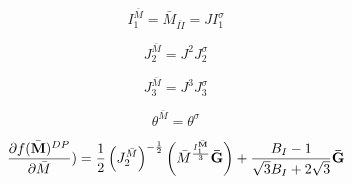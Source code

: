 \begin{equation}
    I_{1}^{\bar{M}} = \bar{M}_{\bar{II}} = J I_{1}^{\sigma}
\end{equation}


\begin{equation}
    J_{2}^{\bar{M}} = J^2 J_{2}^{\sigma}
\end{equation}


\begin{equation}
    J_{3}^{\bar{M}} = J^3 J_{3}^{\sigma}
\end{equation}


\begin{equation}
    \theta^{\bar{M}} = \theta^{\sigma}
\end{equation}


\begin{equation}
    \frac{ \partial f ( \bar{\bf M} )^{DP} }{ \partial \bar{M}} )\\
    = \frac{ 1 }{2} \left( J_{2}^{\bar{M}}  \right)^{-\frac{1}{2} } \left( \bar{M} ^ \frac{I_{1}^{\bar{\bf M}} }{3} {\bf \bar{G}} \right) + \frac{B_I -1 }{\sqrt{3} B_I + 2 \sqrt{3} } {\bf \bar{G}}
\end{equation}

